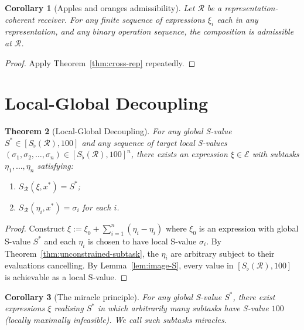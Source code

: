 \documentclass[twocolumn,11pt,a4paper]{article}
\theoremstyle{thmstyle}
\newtheorem{theorem}{Theorem}[section]
\newtheorem{corollary}[theorem]{Corollary}
\theoremstyle{thmstyle}
\theoremstyle{definition}
\theoremstyle{remark}
\newcommand{\Expr}{\mathcal{E}}
\newcommand{\receiver}{\mathcal{R}}
\newcommand{\Sscalar}{S}
\newcommand{\Sfloor}{S_{\flat}}
\begin{document}
\begin{corollary}[Apples and oranges admissibility]
\label{cor:apples-oranges}
Let $\receiver$ be a representation-coherent receiver.
For any finite sequence of expressions $\xi_{i}$ each
in any representation, and any binary operation
sequence, the composition is admissible at
$\receiver$.
\end{corollary}

\begin{proof}
Apply Theorem~\ref{thm:cross-rep} repeatedly.
\end{proof}

\section{Local-Global Decoupling}
\label{sec:local-global-decoupling}

\begin{theorem}[Local-Global Decoupling]\label{thm:lg-decoupling}
For any global S-value $\Sscalar^{*} \in
[\Sfloor(\receiver), 100]$ and any sequence of target
local S-values
$(\sigma_{1}, \sigma_{2}, \ldots, \sigma_{n})
\in [\Sfloor(\receiver), 100]^{n}$, there exists an
expression $\xi \in \Expr$ with subtasks
$\eta_{1}, \ldots, \eta_{n}$ satisfying:
\begin{enumerate}[nosep,label=(\roman*)]
\item $\Sscalar_{\receiver}(\xi, x^{*}) = \Sscalar^{*}$;
\item $\Sscalar_{\receiver}(\eta_{i}, x^{*}) = \sigma_{i}$
      for each $i$.
\end{enumerate}
\end{theorem}

\begin{proof}
Construct $\xi := \xi_{0} + \sum_{i=1}^{n} (\eta_{i} - \eta_{i})$
where $\xi_{0}$ is an expression with global S-value
$\Sscalar^{*}$ and each $\eta_{i}$ is chosen to have
local S-value $\sigma_{i}$.  By
Theorem~\ref{thm:unconstrained-subtask}, the
$\eta_{i}$ are arbitrary subject to their evaluations
cancelling.  By Lemma~\ref{lem:image-S}, every value
in $[\Sfloor(\receiver), 100]$ is achievable as a
local S-value.
\end{proof}

\begin{corollary}[The miracle principle]\label{cor:miracle}
For any global S-value $\Sscalar^{*}$, there exist
expressions $\xi$ realising $\Sscalar^{*}$ in which
arbitrarily many subtasks have S-value $100$
(\emph{locally maximally infeasible}).  We call such
subtasks \emph{miracles}.
\end{corollary}
\end{document}
